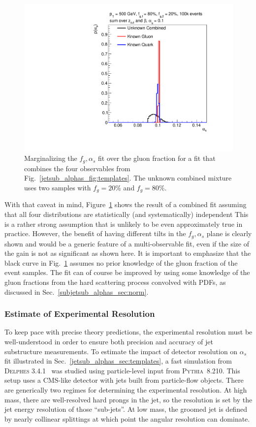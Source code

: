 \documentclass[11pt]{cernrep}
\begin{document}
\begin{figure}[t]
\begin{center}
\includegraphics[width = 0.5\columnwidth]{jetsub_alphas_combination23451324.pdf}
\end{center}
\caption{Marginalizing the $f_g,\alpha_s$ fit over the gluon fraction for a fit that combines the four observables from Fig.~\ref{jetsub_alphas_fig:templates}.  The unknown combined mixture uses two samples with $f_g=20\%$ and $f_g=80\%$.}
\label{jetsub_alphas_fig:combo}
\end{figure}

With that caveat in mind, Figure~\ref{jetsub_alphas_fig:combo} shows the result of a combined fit assuming that all four distributions are statistically (and systematically) independent
%
This is a rather strong assumption that is unlikely to be even approximately true in practice.
%
However, the benefit of having different tilts in the $f_g,\alpha_s$ plane is clearly shown and would be a generic feature of a multi-observable fit, even if the size of the gain is not as significant as shown here.
%
It is important to emphasize that the black curve in Fig.~\ref{jetsub_alphas_fig:combo} assumes no prior knowledge of the gluon fraction of the event samples.
%
The fit can of course be improved by using some knowledge of the gluon fractions from the hard scattering process convolved with PDFs, as discussed in Sec.~\ref{subjetsub_alphas_sec:norm}.

\subsubsection{Estimate of Experimental Resolution}
\label{jetsub_alphas_sec:resolution}

To keep pace with precise theory predictions, the experimental resolution must be well-understood in order to ensure both precision and accuracy of jet substructure measurements.
%
To estimate the impact of detector resolution on $\alpha_s$ fit illustrated in Sec.~\ref{jetsub_alphas_sec:templates}, a fast simulation from \textsc{Delphes} 3.4.1~\cite{deFavereau:2013fsa} was studied using particle-level input from \textsc{Pythia~8}.210.
%
This setup uses a CMS-like detector with jets built from particle-flow objects.
%
There are generically two regimes for determining the experimental resolution.
%
At high mass, there are well-resolved hard prongs in the jet, so the resolution is set by the jet energy resolution of those ``sub-jets''.
%
At low mass, the groomed jet is defined by nearly collinear splittings at which point the angular resolution can dominate.
\end{document}
